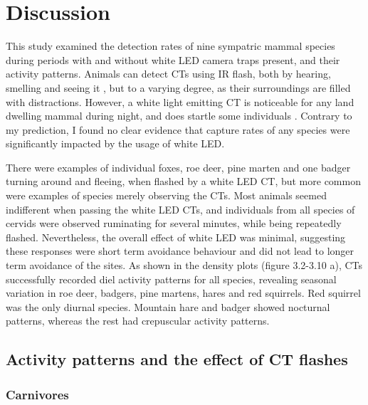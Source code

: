 \chapter{Discussion}

This study examined the detection rates of nine sympatric mammal species during periods with and without white LED camera traps present, and their activity patterns. 
Animals can detect CTs using IR flash, both by hearing, smelling and seeing it \autocite{Meek2014a}, but to a varying degree, as their surroundings are filled with distractions. 
However, a white light emitting CT is noticeable for any land dwelling mammal during night, and does startle some individuals \autocite{Meek2014a, Rovero2013, Glen2013a}.
Contrary to my prediction, I found no clear evidence that capture rates of any species were significantly impacted by the usage of white LED. 

There were examples of individual foxes, roe deer, pine marten and one badger turning around and fleeing, when flashed by a white LED CT, but more common were examples of species merely observing the CTs.
Most animals seemed indifferent when passing the white LED CTs, and individuals from all species of cervids were observed ruminating for several minutes, while being repeatedly flashed.
Nevertheless, the overall effect of white LED was minimal, suggesting these responses were short term avoidance behaviour and did not lead to longer term avoidance of the sites.
As shown in the density plots (figure 3.2-3.10 a), CTs successfully recorded diel activity patterns for all species, revealing seasonal variation in roe deer, badgers, pine martens, hares and red squirrels. %
Red squirrel was the only diurnal species. Mountain hare and badger showed nocturnal patterns, whereas the rest had crepuscular activity patterns.%


\section{Activity patterns and the effect of CT flashes}

\subsection{Carnivores}

